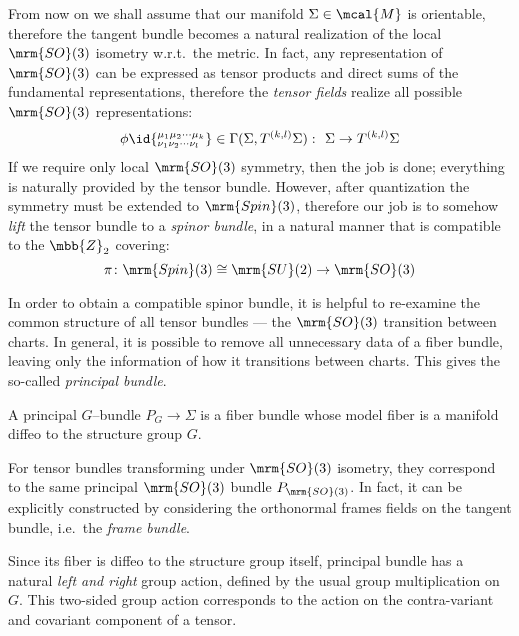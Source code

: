 \documentclass[a4paper,11pt]{article}
\begin{document}
	From now on we shall assume that our manifold $\Sigma\in\mcal{M}$ is orientable, therefore the tangent bundle becomes a natural realization of the local $\mrm{SO}(3)$ isometry w.r.t.~the metric. In fact, any representation of $\mrm{SO}(3)$ can be expressed as tensor products and direct sums of the fundamental representations, therefore the \textit{tensor fields} realize all possible $\mrm{SO}(3)$ representations:
	\begin{equation}
		\phi\id{
			^{\mu_1\mu_2\cdots\mu_k}
			_{\nu_1\nu_2\cdots\nu_l}
		}
		\in \Gamma(\Sigma,T^{(k,l)}\Sigma)
		\,\colon\ 
		\Sigma\to T^{(k,l)}\Sigma
	\end{equation}
	If we require only local $\mrm{SO}(3)$ symmetry, then the job is done; everything is naturally provided by the tensor bundle. However, after quantization the symmetry must be extended to $\mrm{Spin}(3)$, therefore our job is to somehow \textit{lift} the tensor bundle to a \textit{spinor bundle}, in a natural manner that is compatible to the $\mbb{Z}_2$ covering:
	\begin{equation}
		\pi\colon
		\mrm{Spin}(3)\cong\mrm{SU}(2)
		\to
		\mrm{SO}(3)
	\end{equation}
	
	In order to obtain a compatible spinor bundle, it is helpful to re-examine the common structure of all tensor bundles --- the $\mrm{SO}(3)$ transition between charts. In general, it is possible to remove all unnecessary data of a fiber bundle, leaving only the information of how it transitions between charts. This gives the so-called \textit{principal bundle}. 
	
	\begin{definition*}
		A principal $G$--bundle $P_G\to\Sigma$ is a fiber bundle whose model fiber is a manifold diffeo to the structure group $G$. 
	\end{definition*}
	
	For tensor bundles transforming under $\mrm{SO}(3)$ isometry, they correspond to the same principal $\mrm{SO}(3)$ bundle $P_{\mrm{SO}(3)}$. In fact, it can be explicitly constructed by considering the orthonormal frames fields on the tangent bundle, i.e.~the \textit{frame bundle}. 
	
	Since its fiber is diffeo to the structure group itself, principal bundle has a natural \textit{left and right} group action, defined by the usual group multiplication on $G$. This two-sided group action corresponds to the action on the contra-variant and covariant component of a tensor. 
	
\end{document}

